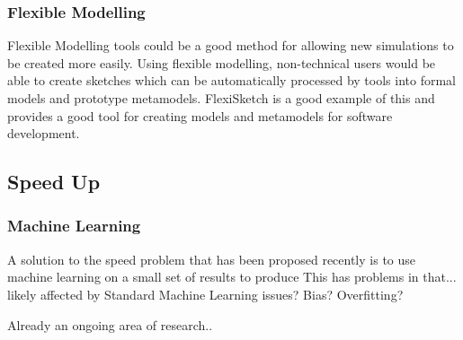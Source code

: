 \documentclass{UoYCSproject}
\begin{document}



\subsubsection{Flexible Modelling}
Flexible Modelling tools could be a good method for allowing new simulations to be created more easily. Using flexible modelling, non-technical users would be able to create sketches which can be automatically processed by tools into formal models and prototype metamodels\cite{Paige2017}. FlexiSketch is a good example of this and provides a good tool for creating models and metamodels for software development\cite{flexisketch}.

\subsection{Speed Up}

\subsubsection{Machine Learning}
A solution to the speed problem that has been proposed recently is to use machine learning on a small set of results to produce\cite{kieran_machine_learning}
This has problems in that...
likely affected by Standard Machine Learning issues? Bias? Overfitting?

Already an ongoing area of research.. 
\end{document}
